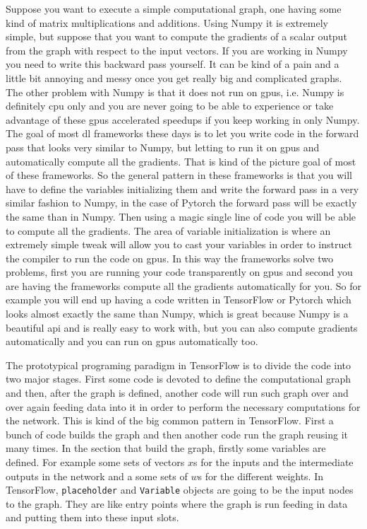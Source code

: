 \documentclass[11pt,a4paper]{article}
\begin{document}
Suppose you want to execute a simple computational graph, one having some kind of matrix multiplications and additions. Using Numpy it is extremely simple, but suppose that you want to compute the gradients of a scalar output from the graph with respect to the input vectors. If you are working in Numpy you need to write this backward pass yourself. It can be kind of a pain and a little bit annoying and messy once you get really big and complicated graphs. The other problem with Numpy is that it does not run on \glspl{gpu}, i.e. Numpy is definitely \gls{cpu} only and you are never going to be able to experience or take advantage of these \glspl{gpu} accelerated speedups if you keep working in only Numpy. The goal of most \gls{dl} frameworks these days is to let you write code in the forward pass that looks very similar to Numpy, but letting to run it on \glspl{gpu} and automatically compute all the gradients. That is kind of the picture goal of most of these frameworks. So the general pattern in these frameworks is that you will have to define the variables initializing them and write the forward pass in a very similar fashion to Numpy, in the case of Pytorch the forward pass will be exactly the same than in Numpy. Then using a magic single line of code you will be able to compute all the gradients. The area of variable initialization is where an extremely simple tweak will allow you to cast your variables in order to instruct the compiler to run the code on \glspl{gpu}. In this way the frameworks solve two problems, first you are running your code transparently on \glspl{gpu} and second you are having the frameworks compute all the gradients automatically for you. So for example you will end up having a code written in TensorFlow or Pytorch which looks almost exactly the same than Numpy, which is great because Numpy is a beautiful \gls{api} and is really easy to work with, but you can also compute gradients automatically and you can run on \glspl{gpu} automatically too. 

The prototypical programing paradigm in TensorFlow is to divide the code into two major stages. First some code is devoted to define the computational graph and then, after the graph is defined, another code will run such graph over and over again feeding data into it in order to perform the necessary computations for the network. This is kind of the big common pattern in TensorFlow. First a bunch of code builds the graph and then another code run the graph reusing it many times. In the section that build the graph, firstly some variables are defined. For example some sets of vectors $x$s for the inputs and the intermediate outputs in the network and a some sets of $w$s for the different weights. In TensorFlow, \texttt{placeholder} and \texttt{Variable} objects are going to be the input nodes to the graph. They are like entry points where the graph is run feeding in data and putting them into these input slots.
\end{document}

